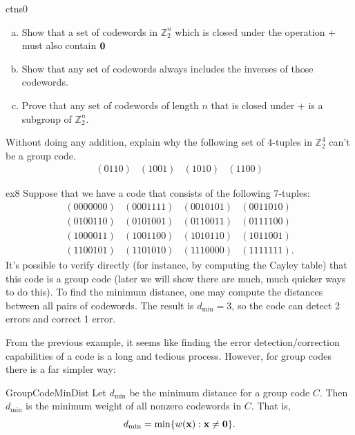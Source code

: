 \begin{exercise}{ctns0}
\begin{enumerate}[(a)]
\item
Show that a set of codewords in
$\mathbb{Z}_2^n$ which is closed under the operation + must also contain ${\bold 0}$ 
\item
Show that any set of codewords always includes the inverses of those codewords.
\item
Prove that any set of codewords of length $n$ that is closed under + is a subgroup of $\mathbb{Z}_2^n$.
\end{enumerate}
\end{exercise} 
 
\begin{exercise}{}
Without doing any addition, explain why the following set of 4-tuples in
$\mathbb{Z}_2^4$ can't be a group code. 
\[
\begin{array}{cccc}
(0110) & (1001) & (1010) & (1100)
\end{array}
\]
 \end{exercise}

 
\begin{example}{ex8}
Suppose that we have a code that consists of the following 7-tuples: 
\[
\begin{array}{cccc}
(0000000) & (0001111) & (0010101) & (0011010) \\
(0100110) & (0101001) & (0110011) & (0111100) \\
(1000011) & (1001100) & (1010110) & (1011001) \\
(1100101) & (1101010) & (1110000) & (1111111).
\end{array}
\]
It's possible to verify directly (for instance, by computing the Cayley table) that this code 
is a group code (later we will show there are much, much quicker ways to do this).
To find the minimum distance, one may compute the distances
between all pairs of codewords. The result is $d_{\min} = 3$, so the code can detect 2 errors and correct 1 error.  
\end{example}
 From the previous example, it seems like finding the error detection/correction capabilities of a code is a long and tedious process. However, for group codes there is a far simpler way:
 
\begin{prop}{GroupCodeMinDist}
Let $d_{\min}$ be the minimum distance for a group code $C$. Then
$d_{\min}$ is the minimum weight of all nonzero
codewords in $C$. That is, 
\[
d_{\min} = \min\{ w({\bold x}) : { {\bold x} \neq {\bold 0}
} \}.
\]
\end{prop}
  
